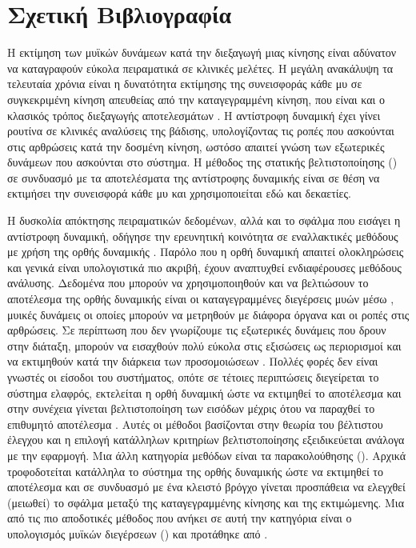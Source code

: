 \section{Σχετική Βιβλιογραφία}

Η εκτίμηση των μυϊκών δυνάμεων κατά την διεξαγωγή μιας κίνησης είναι αδύνατον να καταγραφούν εύκολα πειραματικά σε κλινικές μελέτες. Η μεγάλη ανακάλυψη τα τελευταία χρόνια είναι η δυνατότητα εκτίμησης της συνεισφοράς κάθε μυ σε συγκεκριμένη κίνηση απευθείας από την καταγεγραμμένη κίνηση, που είναι και ο κλασικός τρόπος διεξαγωγής αποτελεσμάτων \cite{hamner10, mclean03}. Η αντίστροφη δυναμική έχει γίνει ρουτίνα σε κλινικές αναλύσεις της βάδισης, υπολογίζοντας τις ροπές που ασκούνται στις αρθρώσεις κατά την δοσμένη κίνηση, ωστόσο απαιτεί γνώση των εξωτερικές δυνάμεων που ασκούνται στο σύστημα. Η μέθοδος της στατικής βελτιστοποίησης () σε συνδυασμό με τα αποτελέσματα της αντίστροφης δυναμικής είναι σε θέση να εκτιμήσει την συνεισφορά κάθε μυ \cite{heintz06, erdemir07} και χρησιμοποιείται εδώ και δεκαετίες.

Η δυσκολία απόκτησης πειραματικών δεδομένων, αλλά και το σφάλμα που εισάγει η αντίστροφη δυναμική, οδήγησε την ερευνητική κοινότητα σε εναλλακτικές μεθόδους με χρήση της ορθής δυναμικής \cite{buchanan04}. Παρόλο που η ορθή δυναμική απαιτεί ολοκληρώσεις και γενικά είναι υπολογιστικά πιο ακριβή, έχουν αναπτυχθεί ενδιαφέρουσες μεθόδους ανάλυσης. Δεδομένα που μπορούν να χρησιμοποιηθούν και να βελτιώσουν το αποτέλεσμα της ορθής δυναμικής είναι οι καταγεγραμμένες διεγέρσεις μυών μέσω , μυικές δυνάμεις οι οποίες μπορούν να μετρηθούν με διάφορα όργανα και οι ροπές στις αρθρώσεις. Σε περίπτωση που δεν γνωρίζουμε τις εξωτερικές δυνάμεις που δρουν στην διάταξη, μπορούν να εισαχθούν πολύ εύκολα στις εξισώσεις ως περιορισμοί και να εκτιμηθούν κατά την διάρκεια των προσομοιώσεων \cite{hamner10, seitha11}. Πολλές φορές δεν είναι γνωστές οι είσοδοι του συστήματος, οπότε σε τέτοιες περιπτώσεις διεγείρεται το σύστημα ελαφρός, εκτελείται η ορθή δυναμική ώστε να εκτιμηθεί το αποτέλεσμα και στην συνέχεια γίνεται βελτιστοποίηση των εισόδων μέχρις ότου να παραχθεί το επιθυμητό αποτέλεσμα \cite{pandy01}. Αυτές οι μέθοδοι βασίζονται στην θεωρία του βέλτιστου έλεγχου και η επιλογή κατάλληλων κριτηρίων βελτιστοποίησης εξειδικεύεται ανάλογα με την εφαρμογή. Μια άλλη κατηγορία μεθόδων είναι τα παρακολούθησης (). Αρχικά τροφοδοτείται κατάλληλα το σύστημα της ορθής δυναμικής ώστε να εκτιμηθεί το αποτέλεσμα και σε συνδυασμό με ένα κλειστό βρόγχο γίνεται προσπάθεια να ελεγχθεί (μειωθεί) το σφάλμα μεταξύ της καταγεγραμμένης κίνησης και της εκτιμώμενης. Μια από τις πιο αποδοτικές μέθοδος που ανήκει σε αυτή την κατηγόρια είναι ο υπολογισμός μυϊκών διεγέρσεων () και προτάθηκε από \cite{thelen06}.

